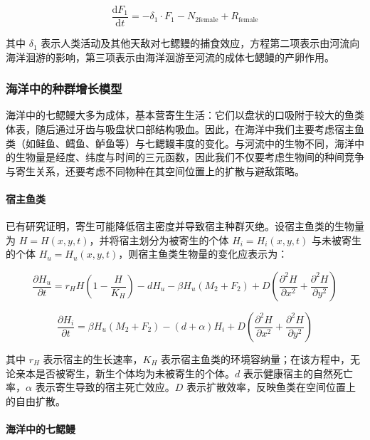 \documentclass[11pt,a4paper]{ctexart}
\begin{document}
\begin{equation}
\frac{\mathrm{d}F_1}{\mathrm{d}t}=-\delta_1\cdot F_1-N_{2\mathrm{female}}+R_{\mathrm{female}}
\end{equation}

其中 $\delta_1$ 表示人类活动及其他天敌对七鳃鳗的捕食效应，方程第二项表示由河流向海洋洄游的影响，第三项表示由海洋洄游至河流的成体七鳃鳗的产卵作用。

\subsubsection{海洋中的种群增长模型}

海洋中的七鳃鳗大多为成体，基本营寄生生活：它们以盘状的口吸附于较大的鱼类体表，随后通过牙齿与吸盘状口部结构吸血。因此，在海洋中我们主要考虑宿主鱼类（如鲑鱼、鳕鱼、鲈鱼等）与七鳃鳗丰度的变化。与河流中的生物不同，海洋中的生物量是经度、纬度与时间的三元函数，因此我们不仅要考虑生物间的种间竞争与寄生关系，还要考虑不同物种在其空间位置上的扩散与避敌策略。

\paragraph{宿主鱼类}

已有研究证明\cite{13}，寄生可能降低宿主密度并导致宿主种群灭绝。设宿主鱼类的生物量为 $H=H(x,y,t)$，并将宿主划分为被寄生的个体 $H_i=H_i(x,y,t)$ 与未被寄生的个体 $H_u=H_u(x,y,t)$，则宿主鱼类生物量的变化应表示为：

\begin{equation}
\frac{\partial H_u}{\partial t}=r_H H\left(1-\frac{H}{K_H}\right)-dH_u-\beta H_u(M_2+F_2)+D\left(\frac{\partial^2 H}{\partial x^2}+\frac{\partial^2 H}{\partial y^2}\right)
\end{equation}

\begin{equation}
\frac{\partial H_i}{\partial t}=\beta H_u(M_2+F_2)-(d+\alpha)H_i+D\left(\frac{\partial^2 H}{\partial x^2}+\frac{\partial^2 H}{\partial y^2}\right)
\end{equation}

其中 $r_H$ 表示宿主的生长速率，$K_H$ 表示宿主鱼类的环境容纳量；在该方程中，无论亲本是否被寄生，新生个体均为未被寄生的个体。$d$ 表示健康宿主的自然死亡率，$\alpha$ 表示寄生导致的宿主死亡效应。$D$ 表示扩散效率，反映鱼类在空间位置上的自由扩散。

\paragraph{海洋中的七鳃鳗}
\end{document}
